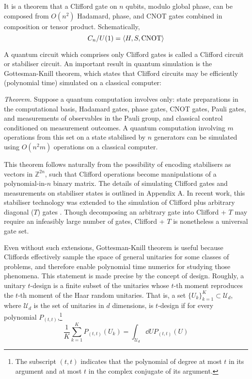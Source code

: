 \documentclass[10pt]{article}
\begin{document}
It is a theorem that a Clifford gate on $n$ qubits, modulo global phase, can be composed from $O(n^2)$ Hadamard, phase, and CNOT gates combined in composition or tensor product. Schematically,
\begin{equation}
C_n / U(1) = \ev{H,S, \text{CNOT}}
\end{equation}

A quantum circuit which comprises only Clifford gates is called a Clifford circuit or stabiliser circuit. An important result in quantum simulation is the Gottesman-Knill theorem, which states that Clifford circuits may be efficiently (polynomial time) simulated on a classical computer:

\begin{displayquote}
\emph{Theorem.} Suppose a quantum computation involves only: state preparations in the computational basis, Hadamard gates, phase gates, CNOT gates, Pauli gates, and measurements of observables in the Pauli group, and classical control conditioned on measurement outcomes. A quantum computation involving $m$ operations from this set on a state stabilised by $n$ generators can be simulated using $O(n^2 m)$ operations on a classical computer.
\end{displayquote}

This theorem follows naturally from the possibility of encoding stabilisers as vectors in $\mathbb{Z}^{2n}$, such that Clifford operations become manipulations of a polynomial-in-$n$ binary matrix. The details of simulating Clifford gates and measurements on stabiliser states is outlined in Appendix A. In recent work, this stabiliser technology was extended to the simulation of Clifford plus arbitrary diagonal ($T$) gates \cite{bravyi2016improved}. Though decomposing an arbitrary gate into Clifford + $T$ may require an infeasibly large number of gates, Clifford + $T$ is nonetheless a universal gate set.

Even without such extensions, Gottesman-Knill theorem is useful because Cliffords effectively sample the space of general unitaries for some classes of problems, and therefore enable polynomial time numerics for studying those phenomena. This statement is made precise by the concept of design. Roughly, a unitary $t$-design is a finite subset of the unitaries whose $t$-th moment reproduces the $t$-th moment of the Haar random unitaries. That is, a set $\{U_k\}_{k=1}^K \subset \mathcal{U}_d$, where $\mathcal{U}_d$ is the set of unitaries in $d$ dimensions, is $t$-design if for every polynomial $P_{(t,t)}$,\footnote{The subscript $(t,t)$ indicates that the polynomial of degree at most $t$ in its argument and at most $t$ in the complex conjugate of its argument.}
\begin{equation}
\frac{1}{K} \sum_{k=1}^K P_{(t,t)}(U_k) = \int_{\mathcal{U}_d} \dd{U} P_{(t,t)} (U)
\end{equation}
\end{document}
